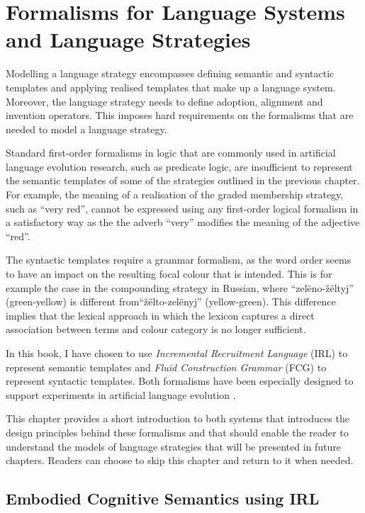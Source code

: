 \chapter{Formalisms for Language Systems and Language Strategies}
\label{s:formalisms}

Modelling a language strategy encompasses defining semantic and
syntactic templates and applying realised templates that make up a
language system. Moreover, the language strategy needs to define
adoption, alignment and invention operators. This imposes hard
requirements on the formalisms that are needed to model a language
strategy.

Standard first-order formalisms in logic that are commonly used in
artificial language evolution research, such as predicate logic, are
insufficient to represent the semantic templates of some of the
strategies outlined in the previous chapter. For example, the meaning
of a realisation of the graded membership strategy, such as ``very
red'', cannot be expressed using any first-order logical formalism in
a satisfactory way as the the adverb ``very'' modifies the meaning of
the adjective ``red''.

The syntactic templates require a grammar formalism, as the word order
seems to have an impact on the resulting focal colour that is
intended.  This is for example the case in the compounding strategy in
Russian, where ``zel\"eno-\v z\"eltyj'' (green-yellow) is different
from``\v z\"elto-zel\"enyj'' (yellow-green). This difference implies
that the lexical approach in which the lexicon captures a direct
association between terms and colour category is no longer sufficient.

In this book, I have chosen to use \emph{Incremental Recruitment
  Language} (IRL) to represent semantic templates and \emph{Fluid
  Construction Grammar} (FCG) to represent syntactic templates. Both
formalisms have been especially designed to support experiments in
artificial language evolution \citep{loetzsch09understanding}.

This chapter provides a short introduction to both systems that
introduces the design principles behind these formalisms and that
should enable the reader to understand the models of language
strategies that will be presented in future chapters. Readers can
choose to skip this chapter and return to it when needed.

\section{Embodied Cognitive Semantics using IRL}
\label{s:irl}

